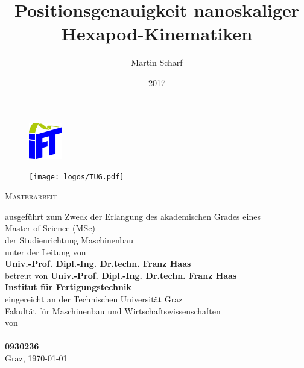 \clearpage
\thispagestyle{empty}
\title{Positionsgenauigkeit nanoskaliger Hexapod-Kinematiken\\}
\date{2017}
\author{Martin Scharf}

\begin{figure}[t]
\begin{minipage}[t]{0.2\textwidth}
    \centering
    \includegraphics[height=16mm]{graphics/logos/IFT.pdf}
\end{minipage}
\hfill
\begin{minipage}[t]{0.3\textwidth}
    \centering
    \texttt{[image: logos/TUG.pdf]}
\end{minipage}
\vspace{1cm}
\end{figure}

\begin{center}
{\LARGE\makeatletter\textbf{\@title} \makeatother}
\end{center}

\vspace{1cm}
\begin{center}
	{\LARGE \textsc{Masterarbeit}}
\end{center}

\vspace{0.5cm}
		
\begin{center}
{
	\large ausgeführt zum Zweck der Erlangung des akademischen Grades eines\\
	Master of Science (MSc)\\
	\vspace{0.5cm}
	der Studienrichtung Maschinenbau\\
	unter der Leitung von\\
	\vspace{1cm}
	\textbf{Univ.-Prof. Dipl.-Ing. Dr.techn. Franz Haas}\\
	betreut von \textbf{Univ.-Prof. Dipl.-Ing. Dr.techn. Franz Haas}\\
	\textbf{Institut für Fertigungstechnik}\\
    \vspace{1cm}
    eingereicht an der Technischen Universität Graz\\
    Fakultät für Maschinenbau und Wirtschaftswissenschaften\\
    von\\
    \vspace{1cm}
    \makeatletter\textbf{\@author} \makeatother\\
    \textbf{0930236}\\
    \vspace{1cm}
    Graz, \today
}
\end{center}